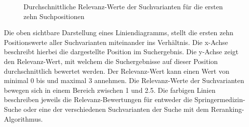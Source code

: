 
\begin{figure}[H]
\centering 
\vspace{-1em}
\caption[Durchschnittliche Relevanz-Werte der Suchvarianten für die ersten zehn Suchpositionen]{Durchschnittliche Relevanz-Werte der Suchvarianten für die ersten zehn Suchpositionen}
\label{fig:Evaluation:Auswertung:RelevanzVarianten}

\footnotesize
{}\rel
  

\vspace{-2em}
\end{figure}

Die oben sichtbare Darstellung eines Liniendiagramms, stellt die ersten zehn Positionswerte aller Suchvarianten miteinander ins Verhältnis. Die x-Achse beschreibt hierbei die dargestellte Position im Suchergebnis. Die y-Achse zeigt den Relevanz-Wert, mit welchem die Suchergebnisse auf dieser Position durchschnittlich bewertet werden. Der Relevanz-Wert kann einen Wert von minimal 0 bis und maximal 3 annehmen. Die Relevanz-Werte der Suchvarianten bewegen sich in einem Bereich zwischen 1 und 2.5. Die farbigen Linien beschreiben jeweils die Relevanz-Bewertungen für entweder die Springermedizin-Suche oder eine der verschiedenen Suchvarianten der Suche mit dem Reranking-Algorithmus. 

